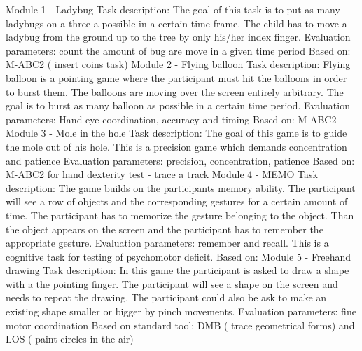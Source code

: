 \vspace{5mm} %
\hfill \break
Module 1 - Ladybug\newline
Task description: The goal of this task is to put as many ladybugs on a three a possible in a certain time frame. The child has to move a ladybug from the ground up to the tree by only his/her index finger.
Evaluation parameters: count the amount of bug are move in a given time period
Based on: M-ABC2 ( insert coins task)
\vspace{5mm} %
\hfill \break
Module 2 - Flying balloon\newline
Task description: Flying balloon is a pointing game where the participant must hit the balloons in order to burst them. The balloons are moving over the screen entirely arbitrary. The goal is to burst as many balloon as possible in a certain time period.
Evaluation parameters: Hand eye coordination, accuracy and timing
Based on: M-ABC2 
\vspace{5mm} %
\hfill \break
Module 3 - Mole in the hole\newline
Task description: The goal of this game is to guide the mole out of his hole. This is a precision game which demands concentration and patience 
Evaluation parameters:  precision, concentration, patience 
Based on: M-ABC2 for hand dexterity test - trace a track
\vspace{5mm} %
\hfill \break
Module 4 - MEMO \newline
Task description: The game builds on the participants memory ability.  The participant will see a row of objects and the corresponding gestures for a certain amount of time. The participant has to memorize the gesture belonging to the object. Than the object appears on the screen and the participant has to remember the appropriate gesture. 
Evaluation parameters: remember and recall. This is a cognitive task for testing of psychomotor deficit.
Based on:
\vspace{5mm} %
\hfill \break
Module 5 - Freehand drawing\newline
Task description: In this game the participant is asked to draw a shape with a the pointing finger.  The participant will see a shape on the screen and needs to repeat the drawing. The participant could also be ask to make an existing shape smaller or bigger by pinch movements.
Evaluation parameters: fine motor coordination
Based on standard tool: DMB ( trace geometrical forms) and LOS ( paint circles in the air)

